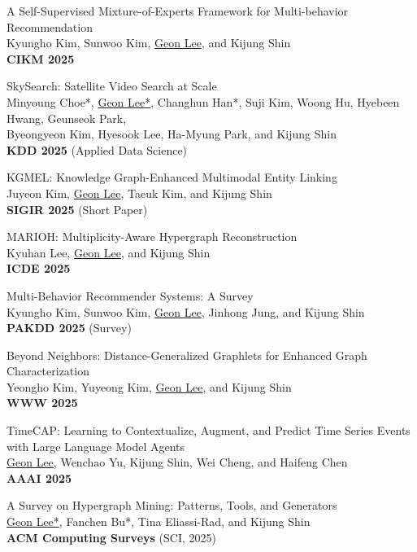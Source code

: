 \documentclass[11pt, letterpaper]{article}
\newcommand{\awardnote}[1]{\enspace{\small\itshape\color{AWARD}#1}}
\begin{document}
{{\begin{enumerate}[
  label={\textcolor{ACCENT}{[\arabic*]}},
  leftmargin=1.8em,
  itemsep=0.7em   %
]
\item A Self-Supervised Mixture-of-Experts Framework for Multi-behavior Recommendation\\
Kyungho Kim, Sunwoo Kim, \underline{Geon Lee}, and Kijung Shin\\
\textbf{CIKM 2025}


\item SkySearch: Satellite Video Search at Scale\\
Minyoung Choe*, \underline{Geon Lee*}, Changhun Han*, Suji Kim, Woong Hu, Hyebeen Hwang, Geunseok Park, \\Byeongyeon Kim, Hyesook Lee, Ha-Myung Park, and Kijung Shin\\
\textbf{KDD 2025} (Applied Data Science)


\item KGMEL: Knowledge Graph-Enhanced Multimodal Entity Linking\\
Juyeon Kim, \underline{Geon Lee}, Taeuk Kim, and Kijung Shin\\
\textbf{SIGIR 2025} (Short Paper)

\item MARIOH: Multiplicity-Aware Hypergraph Reconstruction\\
Kyuhan Lee, \underline{Geon Lee}, and Kijung Shin\\
\textbf{ICDE 2025}

\item Multi-Behavior Recommender Systems: A Survey\\
Kyungho Kim, Sunwoo Kim, \underline{Geon Lee}, Jinhong Jung, and Kijung Shin\\
\textbf{PAKDD 2025} (Survey)\awardnote{Best Survey Paper Award}

\item Beyond Neighbors: Distance-Generalized Graphlets for Enhanced Graph Characterization\\
Yeongho Kim, Yuyeong Kim, \underline{Geon Lee}, and Kijung Shin\\
\textbf{WWW 2025}

\item TimeCAP: Learning to Contextualize, Augment, and Predict Time Series Events with Large Language Model Agents\\
\underline{Geon Lee}, Wenchao Yu, Kijung Shin, Wei Cheng, and Haifeng Chen\\
\textbf{AAAI 2025}



\item A Survey on Hypergraph Mining: Patterns, Tools, and Generators\\
\underline{Geon Lee*}, Fanchen Bu*, Tina Eliassi-Rad, and Kijung Shin\\
\textbf{ACM Computing Surveys} (SCI, 2025)


\end{enumerate}}}
\end{document}
